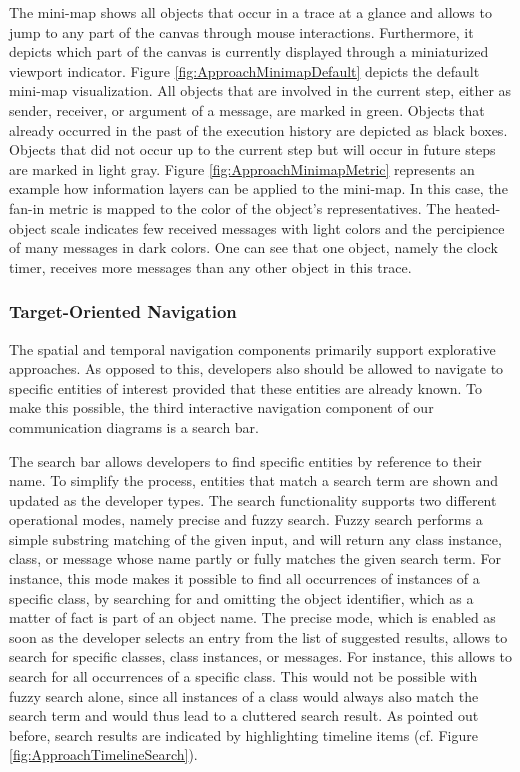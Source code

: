 The mini-map shows all objects that occur in a trace at a glance and allows to jump to any part of the canvas through mouse interactions.
Furthermore, it depicts which part of the canvas is currently displayed through a miniaturized viewport indicator.
Figure \ref{fig:ApproachMinimapDefault} depicts the default mini-map visualization.
All objects that are involved in the current step, either as sender, receiver, or argument of a message, are marked in green.
Objects that already occurred in the past of the execution history are depicted as black boxes.
Objects that did not occur up to the current step but will occur in future steps are marked in light gray.
Figure \ref{fig:ApproachMinimapMetric} represents an example how information layers can be applied to the mini-map.
In this case, the fan-in metric is mapped to the color of the object's representatives.
The heated-object scale indicates few received messages with light colors and the percipience of many messages in dark colors.
One can see that one object, namely the clock timer, receives more messages than any other object in this trace.

\subsubsection{Target-Oriented Navigation}
The spatial and temporal navigation components primarily support explorative approaches.
As opposed to this, developers also should be allowed to navigate to specific entities of interest provided that these entities are already known.
To make this possible, the third interactive navigation component of our communication diagrams is a search bar.

The search bar allows developers to find specific entities by reference to their name.
To simplify the process, entities that match a search term are shown and updated as the developer types.
The search functionality supports two different operational modes, namely precise and fuzzy search.
Fuzzy search performs a simple substring matching of the given input, and will return any class instance, class, or message whose name partly or fully matches the given search term.
For instance, this mode makes it possible to find all occurrences of instances of a specific class, by searching for  and omitting the object identifier, which as a matter of fact is part of an object name.
The precise mode, which is enabled as soon as the developer selects an entry from the list of suggested results, allows to search for specific classes, class instances, or messages.
For instance, this allows to search for all occurrences of a specific class.
This would not be possible with fuzzy search alone, since all instances of a class would always also match the search term and would thus lead to a cluttered search result.
As pointed out before, search results are indicated by highlighting timeline items (cf. Figure \ref{fig:ApproachTimelineSearch}).

